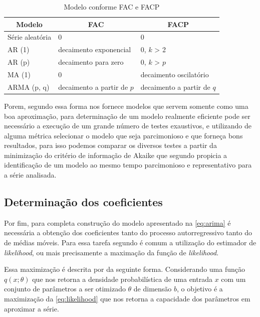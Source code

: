 \documentclass[
    12pt,
    oneside,
    a4paper,
    english,
    brazil
]{abntex2}
\begin{document}
\begin{table}[ht]
    \centering
    \caption{Modelo conforme FAC e FACP}\label{tab:facpacf}
    \begin{tabular}{l l l}
        \multicolumn{1}{c}{Modelo} & \multicolumn{1}{c}{FAC} & \multicolumn{1}{c}{FACP} \\
        \toprule
        Série aleatória  & 0                          & 0                      \\
        AR (1)           & decaimento exponencial     & 0, $k$ > 2             \\
        AR (p)           & decaimento para zero       & 0, $k$ > $p$           \\
        MA (1)           & 0                          & decaimento oscilatório \\
        ARMA (p, q)      & decaimento a partir de $p$ & decaimento a partir de $q$
    \end{tabular}
\end{table}

Porem, segundo   essa  forma nos  fornece modelos  que servem
somente  como uma  boa aproximação,  para determinação  de um  modelo realmente
eficiente  pode  ser necessário  a  execução  de  um  grande número  de  testes
exaustivos,  e  utilizando de  alguma  métrica  selecionar  o modelo  que  seja
parcimonioso  e que  forneça  bons  resultados, para  isso  podemos comparar  os
diversos testes a partir da minimização do critério de informação de Akaike que
segundo   propicia  a identificação  de um  modelo ao  mesmo
tempo parcimonioso e representativo para a série analisada.

\subsection{Determinação dos coeficientes}

Por fim, para completa construção do modelo apresentado na \autoref{eq:arima} é
necessária  a  obtenção  dos  coeficientes tanto  do  processo  autorregressivo
tanto  do de  médias móveis.  Para essa  tarefa segundo  é
comum a utilização do estimador de \textit{likelihood}, ou mais precisamente a
maximação da função de \textit{likelihood}.

Essa  maximização   é  descrita   por     da  seguinte
forma.  Considerando  uma função  $q(x;\theta)$  que  nos retorna  a  densidade
probabilística de uma entrada $x$ com um conjunto de parâmetros a ser otimizado
$\theta$ de dimensão $b$, o objetivo é a maximização da \autoref{eq:likelihood}
que nos retorna a capacidade dos parâmetros em aproximar a série.
\end{document}
